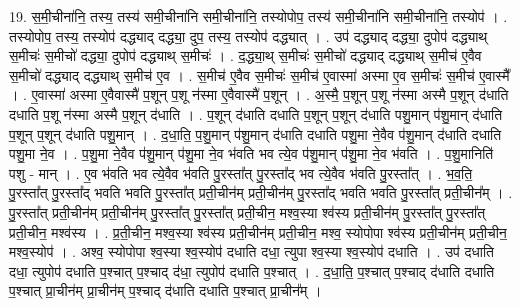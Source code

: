 \documentclass[17pt]{extarticle}
\begin{document}
19. स॒मी॒चीना॑नि॒ तस्य॒ तस्य॑ समी॒चीना॑नि समी॒चीना॑नि॒ तस्योपोप॒ तस्य॑ समी॒चीना॑नि समी॒चीना॑नि॒ तस्योप॑ । . तस्योपोप॒ तस्य॒ तस्योप॑ दद्ध्याद् दद्ध्या॒ दुप॒ तस्य॒ तस्योप॑ दद्ध्यात् । . उप॑ दद्ध्याद् दद्ध्या॒ दुपोप॑ दद्ध्याथ् स॒मीचः॑ स॒मीचो॑ दद्ध्या॒ दुपोप॑ दद्ध्याथ् स॒मीचः॑ । . द॒द्ध्या॒थ् स॒मीचः॑ स॒मीचो॑ दद्ध्याद् दद्ध्याथ् स॒मीच॑ ए॒वैव स॒मीचो॑ दद्ध्याद् दद्ध्याथ् स॒मीच॑ ए॒व । . स॒मीच॑ ए॒वैव स॒मीचः॑ स॒मीच॑ ए॒वास्मा॑ अस्मा ए॒व स॒मीचः॑ स॒मीच॑ ए॒वास्मै᳚ । . ए॒वास्मा॑ अस्मा ए॒वैवास्मै॑ प॒शून् प॒शू न॑स्मा ए॒वैवास्मै॑ प॒शून् । . अ॒स्मै॒ प॒शून् प॒शू न॑स्मा अस्मै प॒शून् द॑धाति दधाति प॒शू न॑स्मा अस्मै प॒शून् द॑धाति । . प॒शून् द॑धाति दधाति प॒शून् प॒शून् द॑धाति पशु॒मान् प॑शु॒मान् द॑धाति प॒शून् प॒शून् द॑धाति पशु॒मान् । . द॒धा॒ति॒ प॒शु॒मान् प॑शु॒मान् द॑धाति दधाति पशु॒मा ने॒वैव प॑शु॒मान् द॑धाति दधाति पशु॒मा ने॒व । . प॒शु॒मा ने॒वैव प॑शु॒मान् प॑शु॒मा ने॒व भ॑वति भव त्ये॒व प॑शु॒मान् प॑शु॒मा ने॒व भ॑वति । . प॒शु॒मानिति॑ पशु - मान् । . ए॒व भ॑वति भव त्ये॒वैव भ॑वति पु॒रस्ता᳚त् पु॒रस्ता᳚द् भव त्ये॒वैव भ॑वति पु॒रस्ता᳚त् । . भ॒व॒ति॒ पु॒रस्ता᳚त् पु॒रस्ता᳚द् भवति भवति पु॒रस्ता᳚त् प्रती॒चीन॑म् प्रती॒चीन॑म् पु॒रस्ता᳚द् भवति भवति पु॒रस्ता᳚त् प्रती॒चीन᳚म् । . पु॒रस्ता᳚त् प्रती॒चीन॑म् प्रती॒चीन॑म् पु॒रस्ता᳚त् पु॒रस्ता᳚त् प्रती॒चीन॒ मश्व॒स्या श्व॑स्य प्रती॒चीन॑म् पु॒रस्ता᳚त् पु॒रस्ता᳚त् प्रती॒चीन॒ मश्व॑स्य । . प्र॒ती॒चीन॒ मश्व॒स्या श्व॑स्य प्रती॒चीन॑म् प्रती॒चीन॒ मश्व॒ स्योपोपा श्व॑स्य प्रती॒चीन॑म् प्रती॒चीन॒ मश्व॒स्योप॑ । . अश्व॒ स्योपोपा श्व॒स्या श्व॒स्योप॑ दधाति दधा॒ त्युपा श्व॒स्या श्व॒स्योप॑ दधाति । . उप॑ दधाति दधा॒ त्युपोप॑ दधाति प॒श्चात् प॒श्चाद् द॑धा॒ त्युपोप॑ दधाति प॒श्चात् । . द॒धा॒ति॒ प॒श्चात् प॒श्चाद् द॑धाति दधाति प॒श्चात् प्रा॒चीन॑म् प्रा॒चीन॑म् प॒श्चाद् द॑धाति दधाति प॒श्चात् प्रा॒चीन᳚म् । \newline
\end{document}
